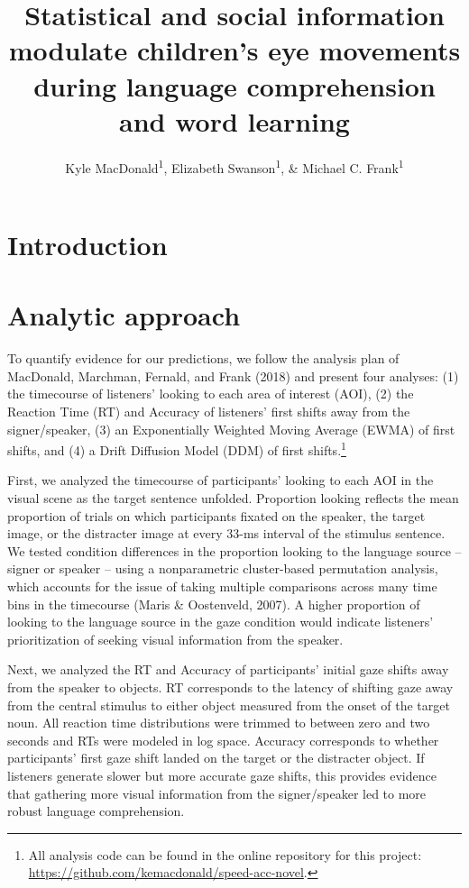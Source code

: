 \documentclass[man,floatsintext]{apa6}
\title{Statistical and social information modulate children's eye movements
during language comprehension and word learning}
\author{Kyle MacDonald\textsuperscript{1}, Elizabeth Swanson\textsuperscript{1},
\& Michael C. Frank\textsuperscript{1}}
\date{}
\affiliation{
\vspace{0.5cm}
\textsuperscript{1} Stanford University}
\let\rmarkdownfootnote\footnote%
\def\footnote{\protect\rmarkdownfootnote}
\theoremstyle{definition}
\theoremstyle{definition}
\theoremstyle{definition}
\theoremstyle{remark}
\begin{document}
\maketitle

\section{Introduction}\label{introduction}

\section{Analytic approach}\label{analytic-approach}

To quantify evidence for our predictions, we follow the analysis plan of
MacDonald, Marchman, Fernald, and Frank (2018) and present four
analyses: (1) the timecourse of listeners' looking to each area of
interest (AOI), (2) the Reaction Time (RT) and Accuracy of listeners'
first shifts away from the signer/speaker, (3) an Exponentially Weighted
Moving Average (EWMA) of first shifts, and (4) a Drift Diffusion Model
(DDM) of first shifts.\footnote{All analysis code can be found in the
  online repository for this project:
  \url{https://github.com/kemacdonald/speed-acc-novel}.}

First, we analyzed the timecourse of participants' looking to each AOI
in the visual scene as the target sentence unfolded. Proportion looking
reflects the mean proportion of trials on which participants fixated on
the speaker, the target image, or the distracter image at every 33-ms
interval of the stimulus sentence. We tested condition differences in
the proportion looking to the language source -- signer or speaker --
using a nonparametric cluster-based permutation analysis, which accounts
for the issue of taking multiple comparisons across many time bins in
the timecourse (Maris \& Oostenveld, 2007). A higher proportion of
looking to the language source in the gaze condition would indicate
listeners' prioritization of seeking visual information from the
speaker.

Next, we analyzed the RT and Accuracy of participants' initial gaze
shifts away from the speaker to objects. RT corresponds to the latency
of shifting gaze away from the central stimulus to either object
measured from the onset of the target noun. All reaction time
distributions were trimmed to between zero and two seconds and RTs were
modeled in log space. Accuracy corresponds to whether participants'
first gaze shift landed on the target or the distracter object. If
listeners generate slower but more accurate gaze shifts, this provides
evidence that gathering more visual information from the signer/speaker
led to more robust language comprehension.
\end{document}
